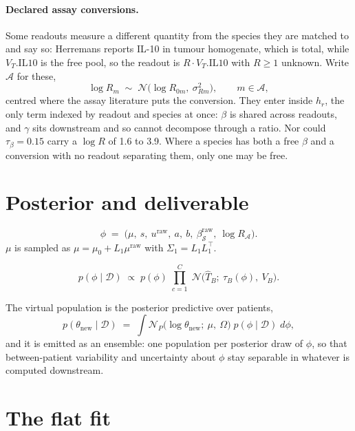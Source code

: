 \documentclass[11pt]{article}
\newcommand{\Ncal}{\mathcal{N}}
\newcommand{\Dset}{\mathcal{D}}
\newcommand{\Tr}{^{\!\top}}
\begin{document}
\paragraph{Declared assay conversions.} Some readouts measure a different
quantity from the species they are matched to and say so: Herremans reports IL-10
in tumour homogenate, which is total, while $V_T.\mathrm{IL10}$ is the free pool,
so the readout is $R\cdot V_T.\mathrm{IL10}$ with $R\ge 1$ unknown. Write $\mathcal{A}$
for these,
\begin{equation}
\log R_m \;\sim\; \Ncal\big(\log R_{0m},\ \sigma_{Rm}^2\big),
\qquad m\in\mathcal{A} ,
\label{eq:auxprior}
\end{equation}
centred where the assay literature puts the conversion. They enter inside $h_r$,
the only term indexed by readout and species at once: $\beta$ is shared across
readouts, and $\gamma$ sits downstream and so cannot decompose through a ratio.
Nor could $\tau_\beta=0.15$ carry a $\log R$ of 1.6 to 3.9. Where a species has
both a free $\beta$ and a conversion with no readout separating them, only one
may be free.

\section{Posterior and deliverable}

\begin{equation}
\phi \;=\;
\big(\mu,\ s,\ u^{\text{raw}},\
a,\ b,\ \beta^{\text{raw}}_{\mathcal{S}},\ \log R_{\mathcal{A}}\big).
\end{equation}
$\mu$ is sampled as $\mu = \mu_0 + L_1\mu^{\text{raw}}$ with
$\Sigma_1 = L_1L_1\Tr$.

\begin{equation}
p(\phi\mid\Dset)
\;\propto\;
p(\phi)\;\prod_{c=1}^{C}\;
\Ncal\big(\widehat T_{B};\ \tau_{B}(\phi),\ V_{B}\big).
\label{eq:post}
\end{equation}

The virtual population is the posterior predictive over patients,
\begin{equation}
p(\theta_{\text{new}}\mid\Dset)
\;=\;
\int \Ncal_P\!\big(\log\theta_{\text{new}};\ \mu,\ \Omega\big)\;
p(\phi\mid\Dset)\;d\phi ,
\label{eq:vpop}
\end{equation}
and it is emitted as an ensemble: one population per posterior draw of $\phi$,
so that between-patient variability and uncertainty about $\phi$ stay separable
in whatever is computed downstream.

\section{The flat fit}
\label{sec:flat}
\end{document}
